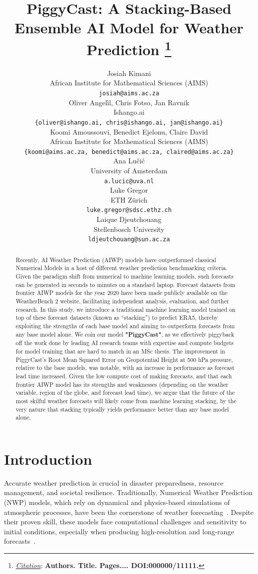 \documentclass{article}
\title{PiggyCast: A Stacking-Based Ensemble AI Model for Weather Prediction
\thanks{\textit{\underline{Citation}}: 
\textbf{Authors. Title. Pages.... DOI:000000/11111.}} 
}
\author{
  Josiah Kimani \\
  African Institute for Mathematical Sciences (AIMS) \\
  \texttt{josiah@aims.ac.za} \\
   \And
  Oliver Angel{\`i}l, Chris Fotso, Jan Ravnik \\
  Ishango.ai \\
  \texttt{\{oliver@ishango.ai, chris@ishango.ai, jan@ishango.ai\}} \\
  \AND
   Koomi Amoussouvi, Benedict Ejelonu, Claire David  \\
  African Institute for Mathematical Sciences (AIMS) \\
  \texttt{\{koomi@aims.ac.za, benedict@aims.ac.za, claired@aims.ac.za\}} \\
  \And
  Ana Lučić \\
  University of Amsterdam \\
  \texttt{a.lucic@uva.nl} \\
  \And
  Luke Gregor \\
  ETH Zürich \\
  \texttt{luke.gregor@sdsc.ethz.ch} \\
  \And
  Laique Djeutchouang\\
  Stellenbosch University\\
  \texttt{ldjeutchouang@sun.ac.za}
}
\begin{document}
\maketitle


\begin{abstract}

Recently, AI Weather Prediction (AIWP) models have outperformed classical Numerical Models in a host of different weather prediction benchmarking criteria. Given the paradigm shift from numerical to machine learning models, such forecasts can be generated in seconds to minutes on a standard laptop. Forecast datasets from frontier AIWP models for the year 2020 have been made publicly available on the WeatherBench 2 website, facilitating independent analysis, evaluation, and further research. In this study, we introduce a traditional machine learning model trained on top of these forecast datasets (known as “stacking”) to predict ERA5, thereby exploiting the strengths of each base model and aiming to outperform forecasts from any base model alone. We coin our model \textbf{"PiggyCast"}, as we effectively piggyback off the work done by leading AI research teams with expertise and compute budgets for model training that are hard to match in an MSc thesis.  The improvement in PiggyCast's Root Mean Squared Error on Geopotential Height at 500 hPa pressure, relative to the base models, was notable, with an increase in performance as forecast lead time increased. Given the low compute cost of making forecasts, and that each frontier AIWP model has its strengths and weaknesses (depending on the weather variable, region of the globe, and forecast lead time), we argue that the future of the most skilful weather forecasts will likely come from machine learning stacking, by the very nature that stacking typically yields performance better than any base model alone.
\end{abstract}





\section{Introduction}
Accurate weather prediction is crucial in disaster preparedness, resource management, and societal resilience. Traditionally, Numerical Weather Prediction (NWP) models, which rely on dynamical and physics-based simulations of atmospheric processes, have been the cornerstone of weather forecasting~\cite{scher2020artificial, rasp2024weatherbench2benchmarkgeneration}. Despite their proven skill, these models face computational challenges and sensitivity to initial conditions, especially when producing high-resolution and long-range forecasts~\cite{kieu2024predictability}.
\end{document}
